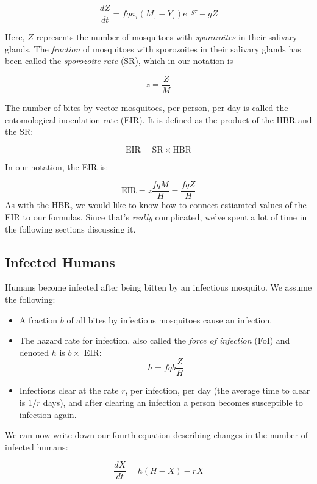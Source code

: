\documentclass[
]{book}
\begin{document}
\begin{equation}
\frac{dZ}{dt} = f q  \kappa_\tau (M_\tau-Y_\tau) e^{-g\tau} -g Z
\end{equation}

Here, \(Z\) represents the number of mosquitoes with \emph{sporozoites} in their salivary glands. The \emph{fraction} of mosquitoes with sporozoites in their salivary glands has been called the \emph{sporozoite rate} (SR), which in our notation is

\[ z = \frac{Z}{M}\]

The number of bites by vector mosquitoes, per person, per day is called the entomological inoculation rate (EIR). It is defined as the product of the HBR and the SR:

\[\mbox{EIR} = \mbox{SR} \times \mbox{HBR}\]

In our notation, the EIR is:

\[\mbox{EIR} = z \frac{fqM}{H} = \frac{fqZ}{H}\]
As with the HBR, we would like to know how to connect estiamted values of the EIR to our formulas. Since that's \emph{really} complicated, we've spent a lot of time in the following sections discussing it.

\hypertarget{RossEqn}{%
\subsection{Infected Humans}\label{RossEqn}}

Humans become infected after being bitten by an infectious mosquito. We assume the following:

\begin{itemize}
\item
  A fraction \(b\) of all bites by infectious mosquitoes cause an infection.
\item
  The hazard rate for infection, also called the \emph{force of infection} (FoI) and denoted \(h\) is \(b \times\) EIR: \[h = fqb \frac{Z}{H}\]
\item
  Infections clear at the rate \(r\), per infection, per day (the average time to clear is \(1/r\) days), and after clearing an infection a person becomes susceptible to infection again.
\end{itemize}

We can now write down our fourth equation describing changes in the number of infected humans:

\begin{equation}
\frac{dX}{dt} = h (H-X) - r X 
\end{equation}
\end{document}

